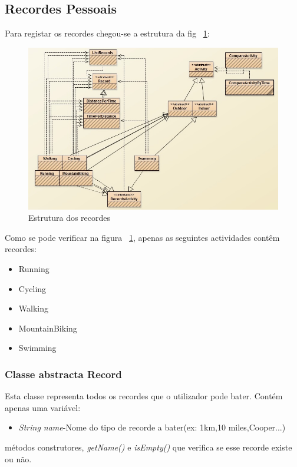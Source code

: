 \documentclass[10pt,notitlepage]{article}
\begin{document}
\subsection{Recordes Pessoais}
Para registar os recordes chegou-se a estrutura da fig ~\ref{fig:recordes}:
~\\
\begin{figure}[h]
\centering
\includegraphics[scale=0.6]{Records.jpg}
\caption{Estrutura dos recordes}
\label{fig:recordes}
\end{figure}


Como se pode verificar na figura ~\ref{fig:recordes}, apenas as seguintes actividades contêm recordes:
\begin{itemize}
\item Running
\item Cycling
\item Walking
\item MountainBiking
\item Swimming
\end{itemize} 


\subsubsection{Classe abstracta Record}

Esta classe representa todos os recordes que o utilizador pode bater. Contém apenas uma variável:
\begin{itemize}
\item \textit{String name}-Nome do tipo de recorde a bater(ex: 1km,10 miles,Cooper...)
\end{itemize}
métodos construtores, \textit{getName()} e \textit{isEmpty()} que verifica se esse recorde existe ou não.
\end{document}
